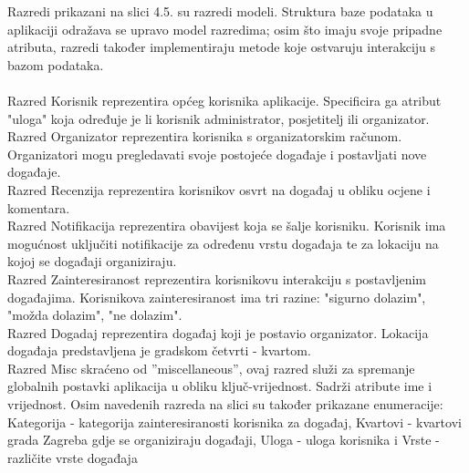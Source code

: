 			\eject
			Razredi prikazani na slici 4.5. su razredi modeli. Struktura baze podataka u aplikaciji odražava se upravo model razredima; osim što imaju svoje pripadne atributa, razredi također implementiraju metode koje ostvaruju interakciju s bazom podataka. \\ 
			\\ Razred Korisnik reprezentira općeg korisnika aplikacije. Specificira ga atribut "uloga" koja određuje je li korisnik administrator, posjetitelj ili organizator.
			\\ Razred Organizator reprezentira korisnika s organizatorskim računom. Organizatori mogu pregledavati svoje postojeće događaje i postavljati nove događaje.
			\\ Razred Recenzija reprezentira korisnikov osvrt na događaj u obliku ocjene i komentara.
			\\ Razred Notifikacija reprezentira obavijest koja se šalje korisniku. Korisnik ima mogućnost uključiti notifikacije za određenu vrstu događaja te za lokaciju na kojoj se događaji organiziraju.
			\\ Razred Zainteresiranost reprezentira korisnikovu interakciju s postavljenim događajima. Korisnikova zainteresiranost ima tri razine: "sigurno dolazim", "možda dolazim", "ne dolazim".
			\\ Razred Dogadaj reprezentira događaj koji je postavio organizator. Lokacija događaja predstavljena je gradskom četvrti - kvartom.
			\\ Razred Misc skraćeno od ”miscellaneous”, ovaj razred služi za spremanje globalnih postavki aplikacija u obliku ključ-vrijednost. Sadrži atribute ime i vrijednost.
			Osim navedenih razreda na slici su također prikazane enumeracije: 
					Kategorija - kategorija zainteresiranosti korisnika za događaj,
					Kvartovi - kvartovi grada Zagreba gdje se organiziraju događaji,
					Uloga - uloga korisnika i 
					Vrste - različite vrste događaja
			
			\pagebreak
			
